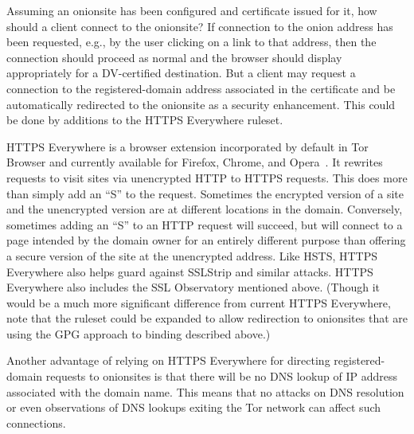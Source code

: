 \documentclass[10pt, conference, compsocconf]{styles/IEEEtran}
\begin{document}

Assuming an onionsite has been configured and certificate issued for
it, how should a client connect to the onionsite? If connection
to the onion address has been requested, e.g., by the user
clicking on a link to that address, then the connection should
proceed as normal and the browser should display appropriately for a
DV-certified destination. But a client may request a connection
to the registered-domain address associated in the certificate
and be automatically redirected to the onionsite as a security
enhancement. This could be done by additions to the HTTPS Everywhere
ruleset.

HTTPS Everywhere is a browser extension incorporated by default in Tor
Browser and currently available for Firefox, Chrome, and
Opera~\cite{https-everywhere}. It rewrites requests to visit sites via
unencrypted HTTP to HTTPS requests. This does more than simply add an
``S'' to the request. Sometimes the encrypted version of a site and
the unencrypted version are at different locations in the domain.
Conversely, sometimes adding an ``S'' to an HTTP request will
succeed, but will connect to a page intended by the domain owner for an
entirely different purpose than offering a secure version of the site
at the unencrypted address.  Like HSTS, HTTPS Everywhere also helps
guard against SSLStrip and similar attacks. HTTPS Everywhere
also includes the SSL Observatory mentioned above.
(Though it would be a much more significant difference from current HTTPS
Everywhere, note that the ruleset could be expanded to allow redirection
to onionsites that are using the GPG approach to binding described
above.)




Another advantage of relying on HTTPS Everywhere for directing
registered-domain requests to onionsites is that there will
be no DNS lookup of IP address associated with the domain name.
This means that no attacks on DNS resolution or even observations
of DNS lookups exiting the Tor network can affect such connections.
\end{document}

